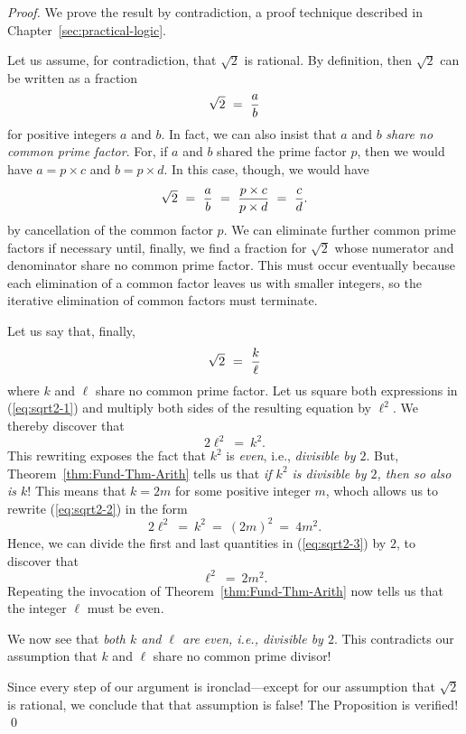 \begin{proof}
We prove the result by contradiction,
a proof technique described in Chapter~\ref{sec:practical-logic}.

Let us assume, for contradiction, that $\sqrt{2}$ is rational.  By
definition, then $\sqrt{2}$ can be written as a fraction
\[ \sqrt{2} \ = \ {a \over b} \]
for positive integers $a$ and $b$.  In fact, we can also insist that
$a$ and $b$ {\em share no common prime factor}.  For, if $a$ and $b$
shared the prime factor $p$, then we would have $a = p \times c$ and
$b = p \times d$.  In this case, though, we would have
\[ \sqrt{2} \ = \ {a \over b} \ = \ \frac{p \times c}{p \times d}
\ = \ {c \over d}.
\]
by cancellation of the common factor $p$.  We can eliminate further
common prime factors if necessary until, finally, we find a fraction
for $\sqrt{2}$ whose numerator and denominator share no common prime
factor.  This must occur eventually because each elimination of a
common factor leaves us with smaller integers, so the iterative
elimination of common factors must terminate.

Let us say that, finally,
\begin{equation}
\label{eq:sqrt2-1}
\sqrt{2} \ = \ {k \over \ell}
\end{equation}
where $k$ and $\ell$ share no common prime factor.  Let us square both
expressions in (\ref{eq:sqrt2-1}) and multiply both sides of the
resulting equation by $\ell^2$.  We thereby discover that
\begin{equation}
\label{eq:sqrt2-2}
2 \ell^2 \ = \ k^2.
\end{equation}
This rewriting exposes the fact that $k^2$ is {\em even},
i.e., {\em divisible by $2$}.  But, Theorem~\ref{thm:Fund-Thm-Arith}
tells us that {\em if $k^2$ is divisible by $2$, then so also is $k$}!
This means that $k = 2m$ for some positive integer $m$, whoch allows
us to rewrite (\ref{eq:sqrt2-2}) in the form
\begin{equation}
\label{eq:sqrt2-3}
2 \ell^2 \ = \ k^2 \ = \ (2m)^2 \ = \ 4m^2.
\end{equation}
Hence, we can divide the first and last quantities in
(\ref{eq:sqrt2-3}) by $2$, to discover that
\[ \ell^2 \ = \ 2m^2. \]
Repeating the invocation of Theorem~\ref{thm:Fund-Thm-Arith} now tells
us that the integer $\ell$ must be even.

We now see that {\em both $k$ and $\ell$ are even, i.e., divisible by
  $2$}.  This contradicts our assumption that $k$ and $\ell$ share no
common prime divisor!

Since every step of our argument is ironclad---except for our
assumption that $\sqrt{2}$ is rational, we conclude that that
assumption is false!  The Proposition is verified!  \qed
\end{proof}

